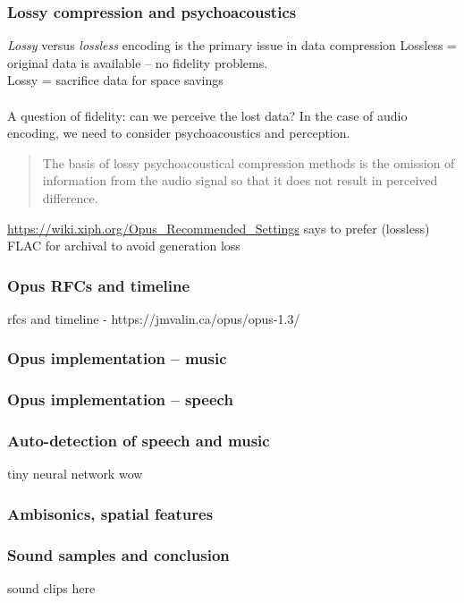 \documentclass{beamer}
\begin{document}
\begin{frame}
	\frametitle{Lossy compression and psychoacoustics}
	\textit{Lossy} versus \textit{lossless} encoding is the primary issue in data compression
	Lossless = original data is available -- no fidelity problems.\\
	Lossy = sacrifice data for space savings\\\ \\
	A question of fidelity: can we perceive the lost data? In the case of audio encoding, we need to consider psychoacoustics and perception.
	\begin{quote}
		The basis of lossy psychoacoustical compression methods is the omission of information from the audio signal so that it does not result in perceived difference.
	\end{quote}
	\href{https://wiki.xiph.org/Opus_Recommended_Settings}{https://wiki.xiph.org/Opus\_Recommended\_Settings} says to prefer (lossless) FLAC for archival to avoid generation loss
\end{frame}

\begin{frame}
	\frametitle{Opus RFCs and timeline}
	rfcs and timeline - https://jmvalin.ca/opus/opus-1.3/
\end{frame}

\begin{frame}
	\frametitle{Opus implementation -- music}
\end{frame}

\begin{frame}
	\frametitle{Opus implementation -- speech}
\end{frame}

\begin{frame}
	\frametitle{Auto-detection of speech and music}
	tiny neural network wow
\end{frame}

\begin{frame}
	\frametitle{Ambisonics, spatial features}
\end{frame}


\begin{frame}
	\frametitle{Sound samples and conclusion}
	sound clips here
\end{frame}
\end{document}
